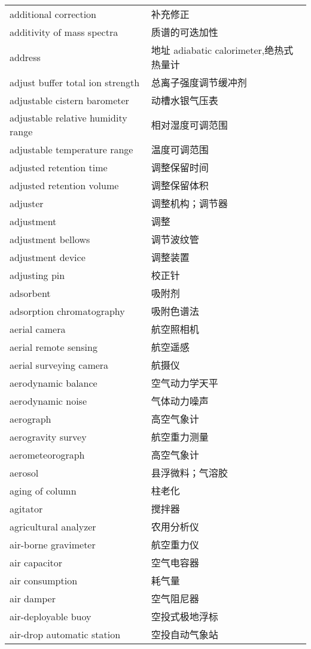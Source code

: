 \documentclass[
]{article}
\begin{document}
\begin{longtable}[]{@{}ll@{}}
additional correction & 补充修正 \\
additivity of mass spectra & 质谱的可迭加性 \\
address & 地址 adiabatic calorimeter,绝热式热量计 \\
adjust buffer total ion strength & 总离子强度调节缓冲剂 \\
adjustable cistern barometer & 动槽水银气压表 \\
adjustable relative humidity range & 相对湿度可调范围 \\
adjustable temperature range & 温度可调范围 \\
adjusted retention time & 调整保留时间 \\
adjusted retention volume & 调整保留体积 \\
adjuster & 调整机构；调节器 \\
adjustment & 调整 \\
adjustment bellows & 调节波纹管 \\
adjustment device & 调整装置 \\
adjusting pin & 校正针 \\
adsorbent & 吸附剂 \\
adsorption chromatography & 吸附色谱法 \\
aerial camera & 航空照相机 \\
aerial remote sensing & 航空遥感 \\
aerial surveying camera & 航摄仪 \\
aerodynamic balance & 空气动力学天平 \\
aerodynamic noise & 气体动力噪声 \\
aerograph & 高空气象计 \\
aerogravity survey & 航空重力测量 \\
aerometeorograph & 高空气象计 \\
aerosol & 县浮微料；气溶胶 \\
aging of column & 柱老化 \\
agitator & 搅拌器 \\
agricultural analyzer & 农用分析仪 \\
air-borne gravimeter & 航空重力仪 \\
air capacitor & 空气电容器 \\
air consumption & 耗气量 \\
air damper & 空气阻尼器 \\
air-deployable buoy & 空投式极地浮标 \\
air-drop automatic station & 空投自动气象站 \\

\end{longtable}
\end{document}
